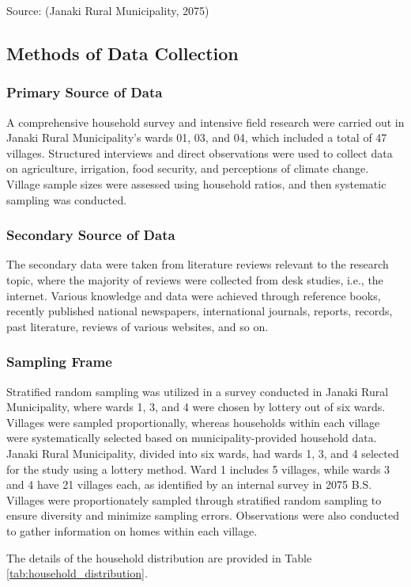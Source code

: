 Source: (Janaki Rural Municipality, 2075)

\subsection{Methods of Data Collection}

\subsubsection{Primary Source of Data}
A comprehensive household survey and intensive field research were carried out in Janaki Rural Municipality's wards 01, 03, and 04, which included a total of 47 villages. Structured interviews and direct observations were used to collect data on agriculture, irrigation, food security, and perceptions of climate change. Village sample sizes were assessed using household ratios, and then systematic sampling was conducted.

\subsubsection{Secondary Source of Data}
The secondary data were taken from literature reviews relevant to the research topic, where the majority of reviews were collected from desk studies, i.e., the internet. Various knowledge and data were achieved through reference books, recently published national newspapers, international journals, reports, records, past literature, reviews of various websites, and so on.

\subsubsection{Sampling Frame}
Stratified random sampling was utilized in a survey conducted in Janaki Rural Municipality, where wards 1, 3, and 4 were chosen by lottery out of six wards. Villages were sampled proportionally, whereas households within each village were systematically selected based on municipality-provided household data. Janaki Rural Municipality, divided into six wards, had wards 1, 3, and 4 selected for the study using a lottery method. Ward 1 includes 5 villages, while wards 3 and 4 have 21 villages each, as identified by an internal survey in 2075 B.S. Villages were proportionately sampled through stratified random sampling to ensure diversity and minimize sampling errors. Observations were also conducted to gather information on homes within each village.

The details of the household distribution are provided in Table \ref{tab:household_distribution}.

